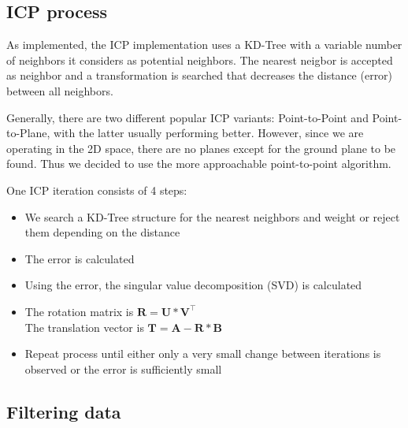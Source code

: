 \documentclass[10pt,twocolumn,letterpaper]{article}
\newcommand{\matr}[1]{\mathbf{#1}} %
\begin{document}
\subsection{ICP process}

As implemented, the ICP implementation uses a KD-Tree with a variable number of neighbors it considers as potential neighbors. The nearest neigbor is accepted as neighbor and a transformation is searched that decreases the distance (error) between all neighbors. 

Generally, there are two different popular ICP variants: Point-to-Point and Point-to-Plane, with the latter usually performing better. However, since we are operating in the 2D space, there are no planes except for the ground plane to be found. Thus we decided to use the more approachable point-to-point algorithm.

One ICP iteration consists of 4 steps:

\begin{itemize}
   \item We search a KD-Tree structure for the nearest neighbors and weight or reject them depending on the distance
   \item The error is calculated
   \item Using the error, the singular value decomposition (SVD) is calculated
   \item The rotation matrix is $\matr{R} =\matr{U} * \matr{V}^{\intercal}$
      \\ The translation vector is $\matr{T} = \matr{A} - \matr{R} * \matr{B}$
      \item Repeat process until either only a very small change between iterations is observed or the error is sufficiently small
\end{itemize}

\subsection{Filtering data}
\end{document}
